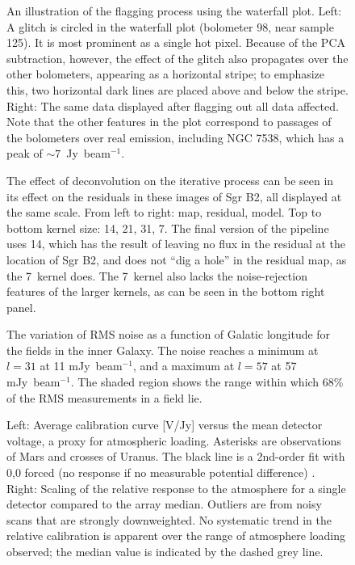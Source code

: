 \documentclass[12pt,preprint]{aastex}
\newcommand\jyb{Jy~beam$^{-1}$}
\def\Figure#1#2#3#4{
\begin{figure}[htb]
\epsscale{#4}
\plotone{#1}
\caption{#2}
\label{#3}
\end{figure}
}
\def\FigureTwo#1#2#3#4#5{
\begin{figure}[htb]
\epsscale{#5}
\plottwo{#1}{#2}
\caption{#3}
\label{#4}
\end{figure}
}
\begin{document}
\begin{figure}
  \caption{An illustration of the flagging process using the waterfall
  plot.  Left: A glitch is circled in the waterfall plot (bolometer
  98, near sample 125).  It is most prominent as a single hot pixel.
  Because of the PCA subtraction, however, the effect of the glitch
  also propagates over the other bolometers, appearing as a horizontal
  stripe; to emphasize this, two horizontal dark lines are placed
  above and below the stripe.  Right: The same data displayed after
  flagging out all data affected.  Note that the other features in the
  plot correspond to passages of the bolometers over real emission,
  including NGC 7538, which has a peak of $\sim 7$~\jyb.}

  \label{fig:Flagger}

\end{figure}

\Figure{f10}%
{The effect of deconvolution on the iterative process can be seen in
its effect on the residuals in these images of Sgr B2, all displayed
at the same scale. From left to right: map, residual, model. Top to
bottom kernel size: 14\farcs4, 21\farcs6, 31\farcs2, 7\farcs2. The
final version of the pipeline uses 14\farcs4, which has the result of
leaving no flux in the residual at the location of Sgr B2, and does
not ``dig a hole'' in the residual map, as the 7\farcs2\ kernel does.
The 7\farcs2\ kernel also lacks the noise-rejection features of the
larger kernels, as can be seen in the bottom right
panel.}{fig:Deconvolution}{1.0}

\Figure{f11}{The variation of RMS noise as a function of Galatic
longitude for the fields in the inner Galaxy.  The noise reaches a
minimum at $l=31$ at 11 m\jyb, and a maximum at $l=57$ at 57 m\jyb.
The shaded region shows the range within which 68\% of the RMS
measurements in a field lie.}{fig:NoiseVsLongitude}{1.0}

\FigureTwo{f12a}{f12b} {Left: Average calibration curve [V/Jy] versus
the mean detector voltage, a proxy for atmospheric loading.  Asterisks
are observations of Mars and crosses of Uranus.  The black line is a
2nd-order fit with 0,0 forced (no response if no measurable potential
difference) .  Right: Scaling of the relative response to the
atmosphere for a single detector compared to the array median.
Outliers are from noisy scans that are strongly downweighted.  No
systematic trend in the relative calibration is apparent over the
range of atmosphere loading observed; the median value is indicated by
the dashed grey line.}{fig:CalibrationCurves}{1.0}
\end{document}
